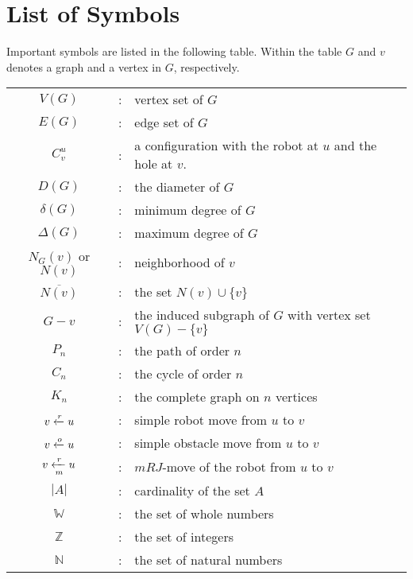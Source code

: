\chapter*{List of Symbols}
Important symbols are listed in the following table.
Within the table $G$ and $v$ denotes a graph and a vertex in $G$, respectively.
\begin{center}
 \begin{tabular}{cll}
 $V(G)$ & : & vertex set of $G$\\[1.4ex]
$E(G)$ & : & edge set of $G$\\[1.4ex]
$C^u_v$ & : & a configuration with the robot at $u$ and the hole at $v$.\\[1.4ex]
$D(G)$ & : & the diameter of $G$\\[1.4ex]
$\delta(G)$ & : & minimum degree of $G$\\[1.4ex]
$\Delta (G)$ & : & maximum degree of $G$\\[1.4ex]
$N_G(v)$ or $N(v)$ & : & neighborhood of $v$\\[1.4ex]
$\overline{N(v)}$ & : & the set $N(v)\cup\{v\}$\\[1.4ex]
$G-v$ & : & the induced subgraph of $G$ with vertex set $V(G)-\{v\}$\\[1.4ex]
$P_n$ & : & the path of order $n$\\[1.4ex]
$C_n$ & : & the cycle of order $n$\\[1.4ex]
$K_n$ & : & the complete graph on $n$ vertices\\[1.4ex]
$v \xleftarrow{r} u$ & : & simple robot move from $u$ to $v$\\[1.4ex]
$v \xleftarrow{o} u$ & : & simple obstacle move from $u$ to $v$\\[1.4ex]
$v \xleftarrow[m]{r} u$ & : & $mRJ$-move of the robot from $u$ to $v$\\[1.4ex]
$|A|$  & : & cardinality of the set $A$\\[1.4ex]
$\mathbb{W}$ & : & the set of whole numbers\\[1.4ex]
$\mathbb{Z}$ & : & the set of integers\\[1.4ex]
$\mathbb{N}$ & : & the set of natural numbers\\[1.4ex]
\end{tabular}
\end{center}


